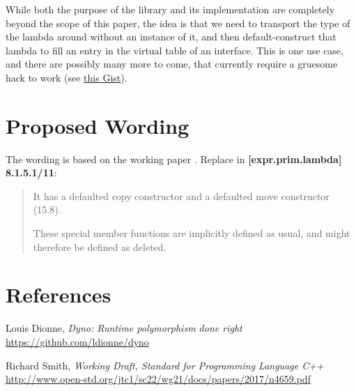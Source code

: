 \documentclass{wg21}
\begin{document}
While both the purpose of the library and its implementation are completely
beyond the scope of this paper, the idea is that we need to transport the
type of the lambda around without an instance of it, and then default-construct
that lambda to fill an entry in the virtual table of an interface. This is one
use case, and there are possibly many more to come, that currently require a
gruesome hack to work (see \href{https://github.com/ldionne/dyno/blob/03eaeded898225660787f03655edb89642a72e7c/include/dyno/detail/empty_object.hpp#L13}{this Gist}).


\section{Proposed Wording}
The wording is based on the working paper \cite{N4659}. Replace in
\textbf{[expr.prim.lambda] 8.1.5.1/11}:

\begin{quote}
  It has a defaulted copy constructor and a defaulted move constructor (15.8).
  \begin{note}
  These special member functions are implicitly defined as usual, and might
  therefore be defined as deleted.
  \end{note}
\end{quote}


\section{References}
\renewcommand{\section}[2]{}%
\begin{thebibliography}{9}

    Louis Dionne,
    \emph{Dyno: Runtime polymorphism done right}\newline
    \url{https://github.com/ldionne/dyno}

    Richard Smith,
    \emph{Working Draft, Standard for Programming Language C++}\newline
    \url{http://www.open-std.org/jtc1/sc22/wg21/docs/papers/2017/n4659.pdf}

\end{thebibliography}
\end{document}
